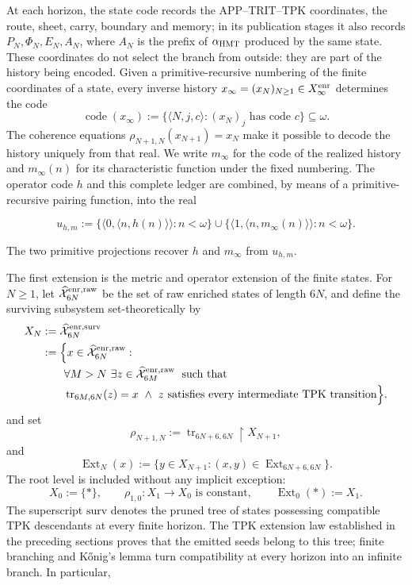 At each horizon, the state code records the APP--TRIT--TPK coordinates,
the route, sheet, carry, boundary and memory; in its publication
stages it also records \(P_N,\Phi_N,E_N,A_N\), where
\(A_N\) is the prefix of \(\alpha_{\rm HMT}\) produced by the same state.
These coordinates do not select the branch from outside: they are part of the history
being encoded. Given a primitive-recursive numbering of the finite coordinates of
a state, every inverse history
\(x_\infty=(x_N)_{N\geq1}\in X_\infty^{\rm enr}\) determines the code
\[
 \operatorname{code}(x_\infty)
 :=\{\langle N,j,c\rangle:(x_N)_j\text{ has code }c\}\subseteq\omega.
\]
The coherence equations
\(\rho_{N+1,N}(x_{N+1})=x_N\) make it possible to decode the history uniquely
from that real. We write \(m_\infty\) for the code of the realized history and
\(m_\infty(n)\) for its characteristic function under the fixed numbering.
The operator code \(h\) and this complete ledger are combined, by means of a
primitive-recursive pairing function, into the real

\[
 u_{h,m}:=
 \{\langle0,\langle n,h(n)\rangle\rangle:n<\omega\}
 \cup
 \{\langle1,\langle n,m_\infty(n)\rangle\rangle:n<\omega\}.
\tag{33a}\label{ix:eq:ch-codigo-conjunto}
\]

The two primitive projections recover \(h\) and \(m_\infty\) from
\(u_{h,m}\).

The first extension is the metric and operator extension of the finite states.
For \(N\ge1\), let \(\widehat{\mathcal X}^{\rm enr,raw}_{6N}\) be the set of
raw enriched states of length \(6N\), and define the surviving subsystem
set-theoretically by
\[
\begin{aligned}
 X_N
 &:=\widehat{\mathcal X}^{\rm enr,surv}_{6N}\\
 &:=\Bigl\{x\in\widehat{\mathcal X}^{\rm enr,raw}_{6N}:\\[-.2ex]
 &\qquad\forall M>N\ \exists z\in
   \widehat{\mathcal X}^{\rm enr,raw}_{6M}\;\text{ such that}\\[-.2ex]
 &\qquad\operatorname{tr}_{6M,6N}(z)=x\ \wedge\
   z\text{ satisfies every intermediate TPK transition}\Bigr\}.
\end{aligned}
\]
and set
\[
 \rho_{N+1,N}:=\operatorname{tr}_{6N+6,6N}\!\upharpoonright X_{N+1},
\]
and
\[
 \operatorname{Ext}_N(x):=
 \{y\in X_{N+1}:(x,y)\in
 \operatorname{Ext}_{6N+6,6N}\}.
\]
The root level is included without any implicit exception:
\[
 X_0:=\{\ast\},\qquad
 \rho_{1,0}:X_1\to X_0\text{ is constant},\qquad
 \operatorname{Ext}_0(\ast):=X_1.
\]
The superscript \(\mathrm{surv}\) denotes the pruned tree of states possessing
compatible TPK descendants at every finite horizon. The TPK extension law
established in the preceding sections proves that the emitted seeds belong to
this tree; finite branching and Kőnig's lemma turn compatibility at every
horizon into an infinite branch. In particular,

